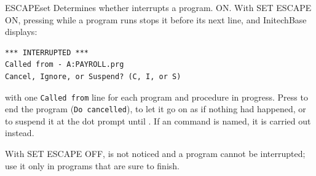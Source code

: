 \begin{XbaseEntry}{ESCAPE}{set}
Determines whether  interrupts a program.
\Syntax
{}
\Defaults
ON.
\Usage
With SET ESCAPE ON, pressing  while a program runs stops it before
its next line, and InitechBase displays:
\begin{verbatim}
*** INTERRUPTED ***
Called from - A:PAYROLL.prg
Cancel, Ignore, or Suspend? (C, I, or S)
\end{verbatim}
with one \texttt{Called from} line for each program and procedure in
progress.  Press  to end the program (\texttt{Do cancelled}),
 to let it go on as if nothing had happened, or  to suspend
it at the dot prompt until .  If an  command is
named, it is carried out instead.

With SET ESCAPE OFF,  is not noticed and a program cannot be
interrupted; use it only in programs that are sure to finish.
\end{XbaseEntry}

